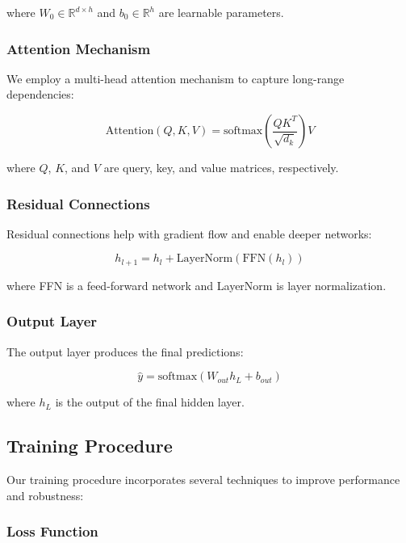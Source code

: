where $W_0 \in \mathbb{R}^{d \times h}$ and $b_0 \in \mathbb{R}^h$ are learnable parameters.

\subsubsection{Attention Mechanism}

We employ a multi-head attention mechanism to capture long-range dependencies:

\begin{equation}
\text{Attention}(Q, K, V) = \text{softmax}\left(\frac{QK^T}{\sqrt{d_k}}\right)V
\end{equation}

where $Q$, $K$, and $V$ are query, key, and value matrices, respectively.

\subsubsection{Residual Connections}

Residual connections help with gradient flow and enable deeper networks:

\begin{equation}
h_{l+1} = h_l + \text{LayerNorm}(\text{FFN}(h_l))
\end{equation}

where FFN is a feed-forward network and LayerNorm is layer normalization.

\subsubsection{Output Layer}

The output layer produces the final predictions:

\begin{equation}
\hat{y} = \text{softmax}(W_{out} h_L + b_{out})
\end{equation}

where $h_L$ is the output of the final hidden layer.

\subsection{Training Procedure}

Our training procedure incorporates several techniques to improve performance and robustness:

\subsubsection{Loss Function}

